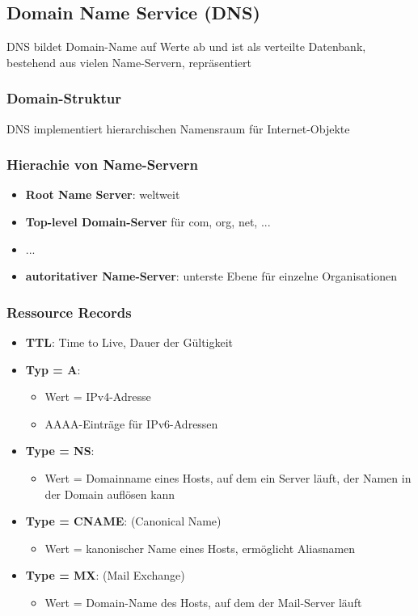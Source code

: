	\subsection{Domain Name Service (DNS)}
		DNS bildet Domain-Name auf Werte ab und ist als verteilte Datenbank, bestehend aus vielen Name-Servern, repräsentiert
		\subsubsection{Domain-Struktur}
			DNS implementiert hierarchischen Namensraum für Internet-Objekte
		\subsubsection{Hierachie von Name-Servern}
			\begin{itemize}
				\item \textbf{Root Name Server}: weltweit
				\item \textbf{Top-level Domain-Server} für com, org, net, ...
				\item ...
				\item \textbf{autoritativer Name-Server}: unterste Ebene für einzelne Organisationen
			\end{itemize}
		\subsubsection{Ressource Records}
			\begin{itemize}
				\item \textbf{TTL}: Time to Live, Dauer der Gültigkeit
				\item \textbf{Typ = A}:
					\begin{itemize}
						\item Wert = IPv4-Adresse
						\item AAAA-Einträge für IPv6-Adressen
					\end{itemize}
				\item \textbf{Type = NS}:
					\begin{itemize}
						\item Wert = Domainname eines Hosts, auf dem ein Server läuft, der Namen in der Domain auflösen kann
					\end{itemize}
				\item \textbf{Type = CNAME}: (Canonical Name)
					\begin{itemize}
						\item Wert = kanonischer Name eines Hosts, ermöglicht Aliasnamen
					\end{itemize}
				\item \textbf{Type = MX}: (Mail Exchange)
					\begin{itemize}
						\item Wert = Domain-Name des Hosts, auf dem der Mail-Server läuft
					\end{itemize}
			\end{itemize}
